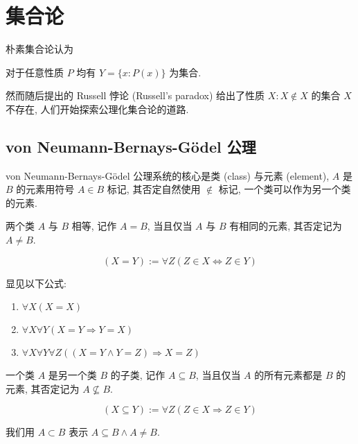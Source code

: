 \section{集合论}

朴素集合论认为

\begin{axiom}
    对于任意性质 \(P\) 均有 \(Y = \{x : P(x)\}\) 为集合.
\end{axiom}

然而随后提出的 Russell 悖论 (Russell's paradox) 给出了性质 \(X: X \notin X\) 的集合 \(X\) 不存在, 人们开始探索公理化集合论的道路. 

\subsection{von Neumann-Bernays-Gödel 公理}

von Neumann-Bernays-Gödel 公理系统的核心是类 (class) 与元素 (element), \(A\) 是 \(B\) 的元素用符号 \(A \in B\) 标记,
其否定自然使用 \(\notin\) 标记, 一个类可以作为另一个类的元素.

\begin{definition}
    两个类 \(A\) 与 \(B\) 相等, 记作 \(A = B\), 当且仅当 \(A\) 与 \(B\) 有相同的元素, 其否定记为 \(A \neq B\).

    \[
        (X = Y) := \forall Z (Z \in X \Leftrightarrow Z \in Y)
    \]
\end{definition}

\begin{corollary}
    显见以下公式:

    \begin{enumerate}
        \item \(\forall X (X = X)\)
        \item \(\forall X \forall Y (X = Y \Rightarrow Y = X)\)
        \item \(\forall X \forall Y \forall Z ((X = Y \land Y = Z) \Rightarrow X = Z)\)
    \end{enumerate}
\end{corollary}

\begin{definition}
    一个类 \(A\) 是另一个类 \(B\) 的子类, 记作 \(A \subseteq B\), 当且仅当 \(A\) 的所有元素都是 \(B\) 的元素, 其否定记为 \(A \nsubseteq B\).

    \[
        (X \subseteq Y) := \forall Z (Z \in X \Rightarrow Z \in Y)
    \]

    我们用 \(A \subset B\) 表示 \(A \subseteq B \land A \neq B\).
\end{definition}

